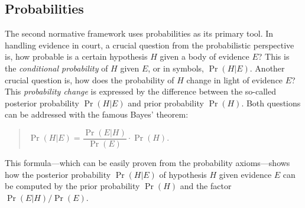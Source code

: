 \documentclass[10pt]{article}
\begin{document}
\subsection{Probabilities}
\label{sec:normfram:prob}
The second normative framework %
uses probabilities as its primary tool. 
In handling evidence in court, a crucial question from the probabilistic perspective is, 
how probable is a certain hypothesis $H$ given a body of evidence $E$? This is 
the \textit{conditional probability} of $H$ given $E$, or in symbols, $\Pr(H|E)$. 
Another crucial question is, how does the probability of $H$ 
change in light of evidence $E$? This \textit{probability change} is expressed by 
the difference between the so-called posterior probability $\Pr(H|E)$ and prior 
probability $\Pr(H)$.
Both questions can be addressed with 
the famous Bayes' theorem:
%
\begin{quotation}
	$\Pr(H|E) = \dfrac{\Pr(E|H)}{\Pr(E)}\cdot\Pr(H)$.
\end{quotation}
%
This formula---which can be easily proven from 
the probability axioms---shows how the 
posterior probability $\Pr(H|E)$ of hypothesis $H$ given evidence $E$ 
can be computed by the prior probability $\Pr(H)$ and the 
factor $\Pr(E|H)/\Pr(E)$.
\end{document}
